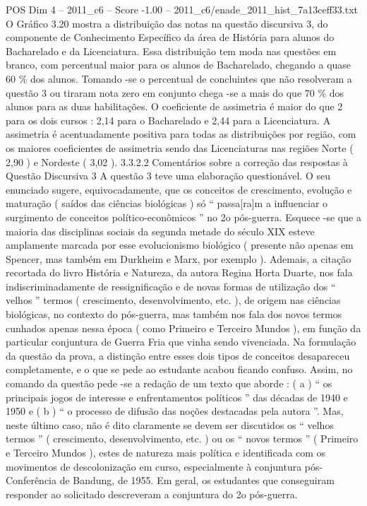 \begin{textsample}{POS Dim 4 – 2011\_c6 – Score -1.00 – 2011\_c6/enade\_2011\_hist\_7a13ceff33.txt}
O Gráfico 3.20 mostra a distribuição das notas na questão discursiva 3, do componente de Conhecimento Específico da área de História para alunos do Bacharelado e da Licenciatura.
Essa distribuição tem moda nas questões em branco, com percentual maior para os alunos de Bacharelado, chegando a quase 60 \% dos alunos.
Tomando -se o percentual de concluintes que não resolveram a questão 3 ou tiraram nota zero em conjunto chega -se a mais do que 70 \% dos alunos para as duas habilitações.
O coeficiente de assimetria é maior do que 2 para os dois cursos : 2,14 para o Bacharelado e 2,44 para a Licenciatura.
A assimetria é acentuadamente positiva para todas as distribuições por região, com os maiores coeficientes de assimetria sendo das Licenciaturas nas regiões Norte ( 2,90 ) e Nordeste ( 3,02 ). 3.3.2.2 Comentários sobre a correção das respostas à Questão Discursiva 3 A questão 3 teve uma elaboração questionável.
O seu enunciado sugere, equivocadamente, que os conceitos de crescimento, evolução e maturação ( saídos das ciências biológicas ) só “ passa[ra]m a influenciar o surgimento de conceitos político-econômicos ” no 2o pós-guerra.
Esquece -se que a maioria das disciplinas sociais da segunda metade do século XIX esteve amplamente marcada por esse evolucionismo biológico ( presente não apenas em Spencer, mas também em Durkheim e Marx, por exemplo ).
Ademais, a citação recortada do livro História e Natureza, da autora Regina Horta Duarte, nos fala indiscriminadamente de ressignificação e de novas formas de utilização dos “ velhos ” termos ( crescimento, desenvolvimento, etc. ), de origem nas ciências biológicas, no contexto do pós-guerra, mas também nos fala dos novos termos cunhados apenas nessa época ( como Primeiro e Terceiro Mundos ), em função da particular conjuntura de Guerra Fria que vinha sendo vivenciada.
Na formulação da questão da prova, a distinção entre esses dois tipos de conceitos desapareceu completamente, e o que se pede ao estudante acabou ficando confuso.
Assim, no comando da questão pede -se a redação de um texto que aborde : ( a ) “ os principais jogos de interesse e enfrentamentos políticos ” das décadas de 1940 e 1950 e ( b ) “ o processo de difusão das noções destacadas pela autora ”.
Mas, neste último caso, não é dito claramente se devem ser discutidos os “ velhos termos ” ( crescimento, desenvolvimento, etc. ) ou os “ novos termos ” ( Primeiro e Terceiro Mundos ), estes de natureza mais política e identificada com os movimentos de descolonização em curso, especialmente à conjuntura pós-Conferência de Bandung, de 1955.
Em geral, os estudantes que conseguiram responder ao solicitado descreveram a conjuntura do 2o pós-guerra.

\end{textsample}
